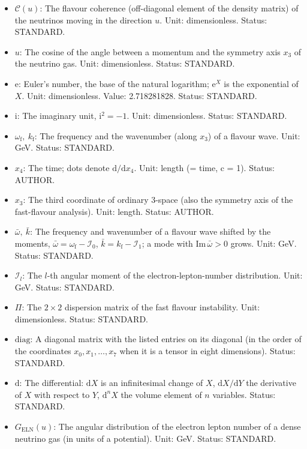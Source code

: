 \documentclass[
  10pt,
]{article}
\providecommand{\tightlist}{%
  \setlength{\itemsep}{0pt}\setlength{\parskip}{0pt}}
\begin{document}
\begin{itemize}
\tightlist
\item
  \(\mathcal{C}(u)\): The flavour coherence (off-diagonal element of the
  density matrix) of the neutrinos moving in the direction \(u\). Unit:
  dimensionless. Status: STANDARD.
\item
  \(u\): The cosine of the angle between a momentum and the symmetry
  axis \(x_3\) of the neutrino gas. Unit: dimensionless. Status:
  STANDARD.
\item
  \(\mathrm{e}\): Euler's number, the base of the natural logarithm;
  \(\mathrm{e}^{X}\) is the exponential of \(X\). Unit: dimensionless.
  Value: 2.718281828. Status: STANDARD.
\item
  \(\mathrm{i}\): The imaginary unit, \(\mathrm{i}^2 = -1\). Unit:
  dimensionless. Status: STANDARD.
\item
  \(\omega_{\mathrm{f}},\ k_{\mathrm{f}}\): The frequency and the
  wavenumber (along \(x_3\)) of a flavour wave. Unit: GeV. Status:
  STANDARD.
\item
  \(x_4\): The time; dots denote \(\mathrm{d}/\mathrm{d}x_4\). Unit:
  length (= time, c = 1). Status: AUTHOR.
\item
  \(x_3\): The third coordinate of ordinary 3-space (also the symmetry
  axis of the fast-flavour analysis). Unit: length. Status: AUTHOR.
\item
  \(\bar\omega,\ \bar k\): The frequency and wavenumber of a flavour
  wave shifted by the moments,
  \(\bar\omega = \omega_{\mathrm{f}} - \mathcal{I}_0\),
  \(\bar k = k_{\mathrm{f}} - \mathcal{I}_1\); a mode with
  \(\mathrm{Im}\,\bar\omega > 0\) grows. Unit: GeV. Status: STANDARD.
\item
  \(\mathcal{I}_l\): The \(l\)-th angular moment of the
  electron-lepton-number distribution. Unit: GeV. Status: STANDARD.
\item
  \(\Pi\): The \(2 \times 2\) dispersion matrix of the fast flavour
  instability. Unit: dimensionless. Status: STANDARD.
\item
  \(\mathrm{diag}\): A diagonal matrix with the listed entries on its
  diagonal (in the order of the coordinates \(x_0, x_1, \dots, x_7\)
  when it is a tensor in eight dimensions). Status: STANDARD.
\item
  \(\mathrm{d}\): The differential: \(\mathrm{d}X\) is an infinitesimal
  change of \(X\), \(\mathrm{d}X/\mathrm{d}Y\) the derivative of \(X\)
  with respect to \(Y\), \(\mathrm{d}^nX\) the volume element of \(n\)
  variables. Status: STANDARD.
\item
  \(G_{\mathrm{ELN}}(u)\): The angular distribution of the electron
  lepton number of a dense neutrino gas (in units of a potential). Unit:
  GeV. Status: STANDARD.
\end{itemize}
\end{document}
